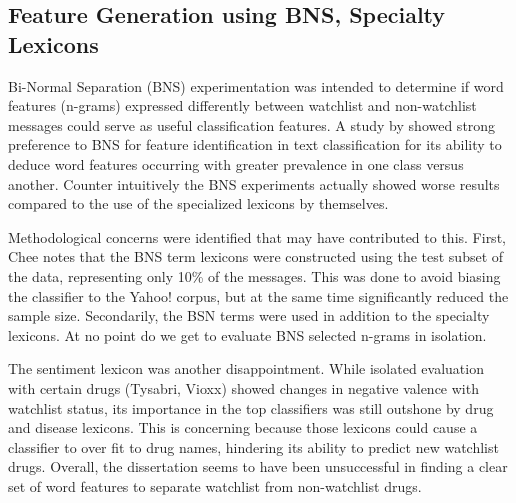 \documentclass[twoside,11pt]{article}
\begin{document}
\subsection{Feature Generation using BNS, Specialty Lexicons}
Bi-Normal Separation (BNS) experimentation was intended to determine if word features (n-grams) expressed differently between watchlist and non-watchlist messages could serve as useful classification features. A study by \citet{Forman} showed strong preference to BNS for feature identification in text classification for its ability to deduce word features occurring with greater prevalence in one class versus another. Counter intuitively the BNS experiments actually showed worse results compared to the use of the specialized lexicons by themselves.
\par Methodological concerns were identified that may have contributed to this. First, Chee notes that the BNS term lexicons were constructed using the test subset of the data, representing only 10\% of the messages. This was done to avoid biasing the classifier to the Yahoo! corpus, but at the same time significantly reduced the sample size. Secondarily, the BSN terms were used in addition to the specialty lexicons. At no point do we get to evaluate BNS selected n-grams in isolation.
\par The sentiment lexicon was another disappointment. While isolated evaluation with certain drugs (Tysabri, Vioxx) showed changes in negative valence with watchlist status, its importance in the top classifiers was still outshone by drug and disease lexicons. This is concerning because those lexicons could cause a classifier to over fit to drug names, hindering its ability to predict new watchlist drugs. Overall, the dissertation seems to have been unsuccessful in finding a clear set of word features to separate watchlist from non-watchlist drugs.
\end{document}
